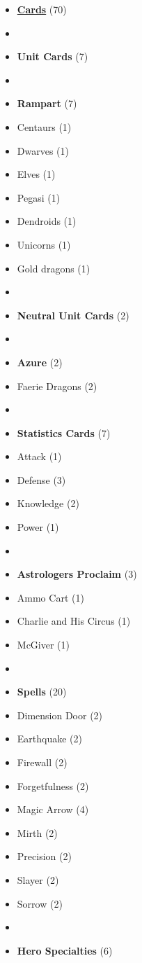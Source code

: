 \begin{multicols*}{3}
\begin{itemize}[leftmargin=0pt, label={}, noitemsep]
  \item \textbf{\normalsize{\underline{Cards}}} (70)
  \item
  \item \textbf{Unit Cards} (7)
  \item
  \item \textbf{Rampart} (7)
  \item Centaurs (1)
  \item Dwarves (1)
  \item Elves (1)
  \item Pegasi (1)
  \item Dendroids (1)
  \item Unicorns (1)
  \item Gold dragons (1)
  \item
  \item \textbf{Neutral Unit Cards} (2)
  \item
  \item \textbf{Azure} (2)
  \item Faerie Dragons (2)
  \item
  \item \textbf{Statistics Cards} (7)
  \item Attack (1)
  \item Defense (3)
  \item Knowledge (2)
  \item Power (1)
  \item
  \item \textbf{Astrologers Proclaim} (3)
  \item Ammo Cart (1)
  \item Charlie and His Circus (1)
  \item McGiver (1)
  \item
  \item \textbf{Spells} (20)
  \item Dimension Door (2)
  \item Earthquake (2)
  \item Firewall (2)
  \item Forgetfulness (2)
  \item Magic Arrow (4)
  \item Mirth (2)
  \item Precision (2)
  \item Slayer (2)
  \item Sorrow (2)
  \item
  \item \textbf{Hero Specialties} (6)

\end{itemize}
\end{multicols*}
